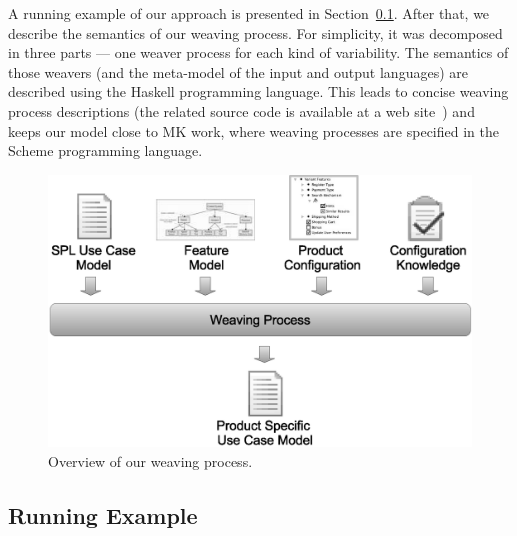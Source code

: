 \documentclass[11pt]{report}
\begin{document}
A running example of our approach is presented in Section~\ref{sub:running}.
After that, we describe the semantics of our weaving process. For simplicity, it
was decomposed in three parts --- one weaver process for each kind of
variability.  The semantics of those weavers (and the meta-model of the input and
output languages) are described using the Haskell programming
language. This leads to concise weaving process
descriptions (the related source code is available at a web site~\cite{spg-url})
and keeps our model close to MK work, where weaving processes are specified in
the Scheme programming language. 

 

\begin{figure}[h]
 \begin{center}
  \includegraphics[scale=0.35]{img/weave-process2.eps}
   \caption{Overview of our weaving process.}
  \label{fig:weave-process}
  \end{center}
\end{figure}

\subsection{Running Example}
\label{sub:running}
\end{document}
